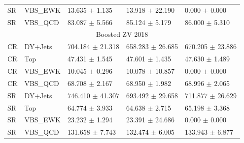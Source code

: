 \begin{table}
\begin{tabular}{lllll}
    SR     & VBS\_EWK & 13.635 \( \pm \) 1.135   & 13.918 \( \pm \) 22.190  & 0.000 \( \pm \) 0.000    \\
    SR     & VBS\_QCD & 83.087 \( \pm \) 5.566   & 85.124 \( \pm \) 5.179   & 86.000 \( \pm \) 5.310   \\
    \midrule
    \multicolumn{5}{c}{Boosted ZV 2018}                                                                \\
    \midrule
    CR     & DY+Jets  & 704.184 \( \pm \) 21.318 & 658.283 \( \pm \) 26.685 & 670.205 \( \pm \) 23.886 \\
    CR     & Top      & 47.431 \( \pm \) 1.545   & 47.601 \( \pm \) 1.435   & 47.630 \( \pm \) 1.489   \\
    CR     & VBS\_EWK & 10.045 \( \pm \) 0.296   & 10.078 \( \pm \) 10.857  & 0.000 \( \pm \) 0.000    \\
    CR     & VBS\_QCD & 68.708 \( \pm \) 2.167   & 68.950 \( \pm \) 1.982   & 68.996 \( \pm \) 2.065   \\
    SR     & DY+Jets  & 746.410 \( \pm \) 41.307 & 693.492 \( \pm \) 29.658 & 711.877 \( \pm \) 26.629 \\
    SR     & Top      & 64.774 \( \pm \) 3.933   & 64.638 \( \pm \) 2.715   & 65.198 \( \pm \) 3.368   \\
    SR     & VBS\_EWK & 23.232 \( \pm \) 1.294   & 23.391 \( \pm \) 24.686  & 0.000 \( \pm \) 0.000    \\
    SR     & VBS\_QCD & 131.658 \( \pm \) 7.743  & 132.474 \( \pm \) 6.005  & 133.943 \( \pm \) 6.877  \\
    \bottomrule
  \end{tabular}\label{tab:fit-values-zv}
\end{table}


